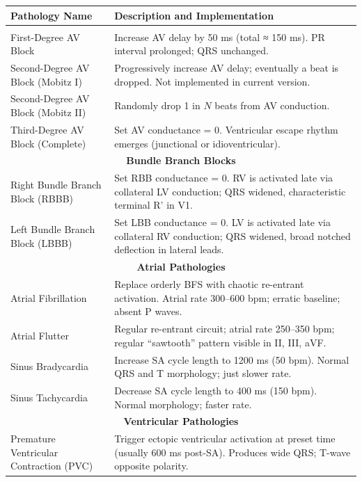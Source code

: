\documentclass[12pt,a4paper,oneside]{book}
\begin{document}
\begin{center}
\begin{longtable}{|l|p{5cm}|}
\hline
\textbf{Pathology Name} & \textbf{Description and Implementation} \\
\hline
\endhead

\hline
\endfoot

\multicolumn{2}{|c|}{\textbf{AV Blocks}} \\
\hline
First-Degree AV Block & Increase AV delay by 50 ms (total ≈ 150 ms). PR interval prolonged; QRS unchanged. \\
\hline
Second-Degree AV Block (Mobitz I) & Progressively increase AV delay; eventually a beat is dropped. Not implemented in current version. \\
\hline
Second-Degree AV Block (Mobitz II) & Randomly drop 1 in $N$ beats from AV conduction. \\
\hline
Third-Degree AV Block (Complete) & Set AV conductance = 0. Ventricular escape rhythm emerges (junctional or idioventricular). \\
\hline
\multicolumn{2}{|c|}{\textbf{Bundle Branch Blocks}} \\
\hline
Right Bundle Branch Block (RBBB) & Set RBB conductance = 0. RV is activated late via collateral LV conduction; QRS widened, characteristic terminal R' in V1. \\
\hline
Left Bundle Branch Block (LBBB) & Set LBB conductance = 0. LV is activated late via collateral RV conduction; QRS widened, broad notched deflection in lateral leads. \\
\hline
\multicolumn{2}{|c|}{\textbf{Atrial Pathologies}} \\
\hline
Atrial Fibrillation & Replace orderly BFS with chaotic re-entrant activation. Atrial rate 300–600 bpm; erratic baseline; absent P waves. \\
\hline
Atrial Flutter & Regular re-entrant circuit; atrial rate 250–350 bpm; regular ``sawtooth'' pattern visible in II, III, aVF. \\
\hline
Sinus Bradycardia & Increase SA cycle length to 1200 ms (50 bpm). Normal QRS and T morphology; just slower rate. \\
\hline
Sinus Tachycardia & Decrease SA cycle length to 400 ms (150 bpm). Normal morphology; faster rate. \\
\hline
\multicolumn{2}{|c|}{\textbf{Ventricular Pathologies}} \\
\hline
Premature Ventricular Contraction (PVC) & Trigger ectopic ventricular activation at preset time (usually 600 ms post-SA). Produces wide QRS; T-wave opposite polarity. \\

\end{longtable}
\end{center}
\end{document}
